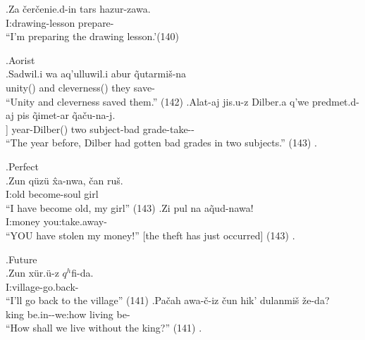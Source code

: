 \exg.\label{sent:ex9}Za \v{c}er\v{c}enie.d-in tars hazur-zawa. \\
    I:\Erg[] drawing-\Gen[] lesson prepare-\Impf[] \\
    ``I'm preparing the drawing lesson.'(140)

\ex.Aorist\\
    \ag.\label{sent:ex11a}Sadwil.i wa aq'ulluwil.i abur \~{q}utarmi\v{s}-na \\
    unity(\Erg[]) and cleverness(\Erg[]) they save-\Aori[] \\
    ``Unity and cleverness saved them.'' (142)
    \bg.\label{sent:ex11b}Alat-aj jis.u-z Dilber.a q'we predmet.d-aj pis \~{q}imet-ar \~{q}a\v{c}u-na-j. \\
    [pass-\Aop[]] year-\Dat[] Dilber(\Erg[]) two subject-\Inel[] bad grade-\Pl[] take-\Aori[]-\Pst[] \\
    ``The year before, Dilber had gotten bad grades in two subjects.'' (143)
    \z.

\ex.Perfect\\
    \ag.\label{sent:ex12a}Zun q\"{u}z\"{u} \^{x}a-nwa, \v{c}an ru\v{s}. \\
    I:\Abs[] old become-\Prf[] soul girl \\
    ``I have become old, my girl'' (143)
    \bg.\label{sent:ex12b}Zi pul na a\~{q}ud-nawa! \\
    I:\Gen[] money you:\Erg[] take.away-\Prf[] \\
    ``YOU have stolen my money!'' [the theft has just occurred] (143)
    \z.

\ex.Future \\
    \ag.\label{sent:ex10a}Zun x\"{u}r.\"{u}-z $q^h$fi-da. \\
    I:\Abs[] village-\Dat[] go.back-\Fut[] \\
    ``I'll go back to the village'' (141)
    \bg.\label{sent:ex10b}Pa\v{c}ah awa-\v{c}-iz \v{c}un hik' dulanmi\v{s} \v{z}e-da? \\
    king be.in-\Neg[]-\Imc[] we:\Abs[] how living be-\Fut[] \\
    ``How shall we live without the king?'' (141)
    \z.

